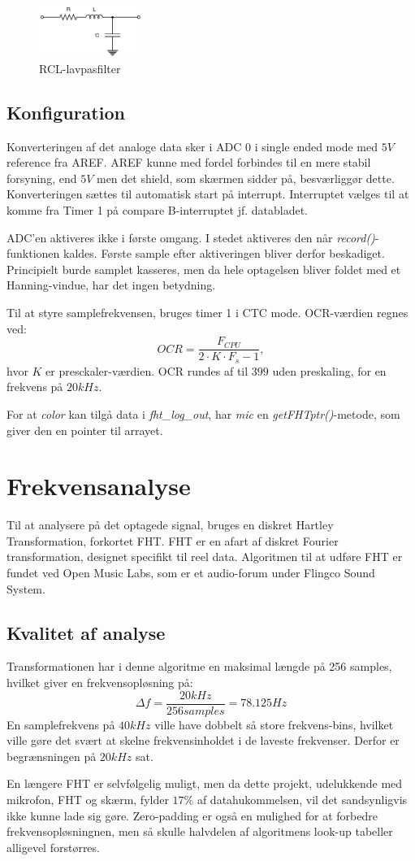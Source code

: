 \begin{figure}[H]
	\center
	\includegraphics[width=0.3\textwidth]{Figur/RCL_diagram.pdf}
	\caption{RCL-lavpasfilter}
	\label{fig:RCL}
\end{figure}

\subsection{Konfiguration}
Konverteringen af det analoge data sker i ADC 0 i single ended mode med $5 V$ reference fra AREF. 
AREF kunne med fordel forbindes til en mere stabil forsyning, end $5 V$ men det shield, som skærmen sidder på, besværliggør dette. 
Konverteringen sættes til automatisk start på interrupt. 
Interruptet vælges til at komme fra Timer 1 på compare B-interruptet jf. databladet.

ADC'en aktiveres ikke i første omgang. 
I stedet aktiveres den når \textit{record()}-funktionen kaldes. 
Første sample efter aktiveringen bliver derfor beskadiget.
Principielt burde samplet kasseres, men da hele optagelsen bliver foldet med et Hanning-vindue, har det ingen betydning. 

Til at styre samplefrekvensen, bruges timer 1 i CTC mode. 
OCR-værdien regnes ved: $$ OCR = \frac{F_{CPU}}{2 \cdot K \cdot F_s - 1}, $$ hvor $K$ er presckaler-værdien.
OCR rundes af til $399 $ uden preskaling, for en frekvens på $20 kHz$. 

For at \textit{color} kan tilgå data i \textit{fht\_log\_out}, har \textit{mic} en \textit{getFHTptr()}-metode, som giver den en pointer til arrayet. 

\section{Frekvensanalyse}
Til at analysere på det optagede signal, bruges en diskret Hartley Transformation, forkortet FHT. 
FHT er en afart af diskret Fourier transformation, designet specifikt til reel data. 
Algoritmen til at udføre FHT er fundet ved Open Music Labs, som er et audio-forum under Flingco Sound System. \cite{fht_arduino}

\subsection{Kvalitet af analyse}
Transformationen har i denne algoritme en maksimal længde på 256 samples, hvilket giver en frekvensopløsning på: $$ \Delta f = \frac{20 kHz}{256 samples} = 78.125 Hz$$ 
En samplefrekvens på $ 40 kHz$ ville have dobbelt så store frekvens-bins, hvilket ville gøre det svært at skelne frekvensinholdet i de laveste frekvenser. 
Derfor er begrænsningen på $20 kHz $ sat. 

En længere FHT er selvfølgelig muligt, men da dette projekt, udelukkende med mikrofon, FHT og skærm, fylder $17 \%$ af datahukommelsen, vil det sandsynligvis ikke kunne lade sig gøre. 
Zero-padding er også en mulighed for at forbedre frekvensopløsningnen, men så skulle halvdelen af algoritmens look-up tabeller alligevel forstørres. 
